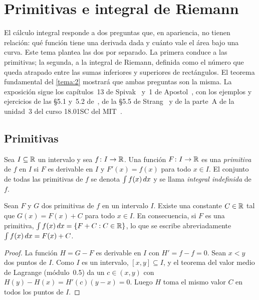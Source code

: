 \chapter{Primitivas e integral de Riemann}
\label{tema:1}

El cálculo integral responde a dos preguntas que, en apariencia, no tienen relación: qué función tiene una derivada dada y cuánto vale el área bajo una curva. Este tema plantea las dos por separado. La primera conduce a las primitivas; la segunda, a la integral de Riemann, definida como el número que queda atrapado entre las sumas inferiores y superiores de rectángulos. El teorema fundamental del \cref{tema:2} mostrará que ambas preguntas son la misma. La exposición sigue los capítulos~13 de Spivak~\cite{spivak} y~1 de Apostol~\cite{apostol}, con los ejemplos y ejercicios de las §5.1 y~5.2 de~\cite{openstax1}, de la §5.5 de Strang~\cite{strang} y de la parte~A de la unidad~3 del curso 18.01SC del MIT~\cite{mit1801}.

\section{Primitivas}

\begin{definicion}[Primitiva]\label{def:primitiva}
Sea $I\subseteq\mathbb{R}$ un intervalo y sea $f\colon I\to\mathbb{R}$. Una función $F\colon I\to\mathbb{R}$ es una \emph{primitiva} de $f$ en $I$ si $F$ es derivable en $I$ y $F'(x)=f(x)$ para todo $x\in I$. El conjunto de todas las primitivas de $f$ se denota $\int f(x)\mathop{}\!d x$ y se llama \emph{integral indefinida} de $f$.
\end{definicion}

\begin{proposicion}\label{prop:primitivas-constante}
Sean $F$ y $G$ dos primitivas de $f$ en un intervalo $I$. Existe una constante $C\in\mathbb{R}$ tal que $G(x)=F(x)+C$ para todo $x\in I$. En consecuencia, si $F$ es una primitiva, $\int f(x)\mathop{}\!d x=\{F+C: C\in\mathbb{R}\}$, lo que se escribe abreviadamente $\int f(x)\mathop{}\!d x=F(x)+C$.
\end{proposicion}

\begin{proof}
La función $H=G-F$ es derivable en $I$ con $H'=f-f=0$. Sean $x<y$ dos puntos de $I$. Como $I$ es un intervalo, $[x,y]\subseteq I$, y el teorema del valor medio de Lagrange (módulo~0.5) da un $c\in(x,y)$ con $H(y)-H(x)=H'(c)(y-x)=0$. Luego $H$ toma el mismo valor $C$ en todos los puntos de $I$.
\end{proof}

